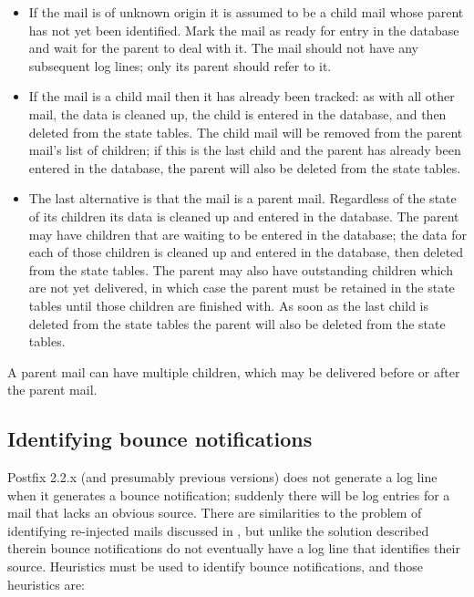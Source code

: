 \begin{itemize}

    \item If the mail is of unknown origin it is assumed to be a child mail
        whose parent has not yet been identified.  Mark the mail as ready
        for entry in the database and wait for the parent to deal with it.
        The mail should not have any subsequent log lines; only its parent
        should refer to it.

    \item If the mail is a child mail then it has already been tracked: as
        with all other mail, the data is cleaned up, the child is entered
        in the database, and then deleted from the state tables.  The child
        mail will be removed from the parent mail's list of children; if
        this is the last child and the parent has already been entered in
        the database, the parent will also be deleted from the state
        tables.

    \item The last alternative is that the mail is a parent mail.
        Regardless of the state of its children its data is cleaned up and
        entered in the database.  The parent may have children that are
        waiting to be entered in the database; the data for each of those
        children is cleaned up and entered in the database, then deleted
        from the state tables.  The parent may also have outstanding
        children which are not yet delivered, in which case the parent must
        be retained in the state tables until those children are finished
        with.  As soon as the last child is deleted from the state tables
        the parent will also be deleted from the state tables.

\end{itemize}

A parent mail can have multiple children, which may be delivered before or
after the parent mail.


\subsection{Identifying bounce notifications}

\label{identifying-bounce-notifications}

Postfix 2.2.x (and presumably previous versions) does not generate a log
line when it generates a bounce notification; suddenly there will be log
entries for a mail that lacks an obvious source.  There are similarities to
the problem of identifying re-injected mails discussed in
, but unlike the solution described
therein bounce notifications do not eventually have a log line that
identifies their source.  Heuristics must be used to identify bounce
notifications, and those heuristics are:

